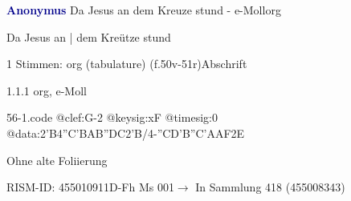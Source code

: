 \documentclass[twocolumn]{book}
\begin{document}
\par \vspace{7pt} \textcolor{darkblue}{\textbf{Anonymus  }}\hfillplus{\textbf{[56]}}\newline Da Jesus an dem Kreuze stund - e-Moll\newline org
\par \begin{itshape}[f.50v, at left:] Da Jesus an | dem Kreütze stund\end{itshape} 
\par \textcolor{darkblue}{}  1 Stimmen: org (tabulature)  (f.50v-51r)\newline Abschrift
\par 1.1.1  org, e-Moll  
\begin{filecontents*}{56-1.code}
@clef:G-2
@keysig:xF
@timesig:0
@data:2'B4''C'BAB''DC2'B/4-''CD'B''C'AAF2E
\end{filecontents*}
\newline
%
\par Ohne alte Foliierung
\par RISM-ID: 455010911\newline D-Fh  Ms 001\newline $\rightarrow$ In Sammlung 418 (455008343)
      
\end{document}
